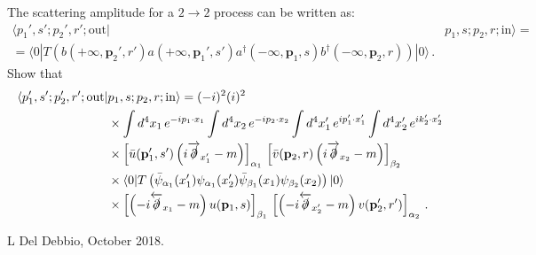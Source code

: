 \documentclass[12pt,a4paper]{article}
\begin{document}
\begin{enumerate}
    The scattering amplitude for a $2\longrightarrow 2$ process can be
    written as: 
    \begin{align}
      \label{eq:4}
      \langle p_1', s'; p_2', r';\mathrm{out} | 
      &p_1, s; p_2, r; \mathrm{in} \rangle 
      = \nonumber \\
      = \langle 0 | T\left(
        b(+\infty,\mathbf{p}_2',r') a(+\infty,\mathbf{p}_1',s') 
        a^\dagger(-\infty,\mathbf{p}_1,s) b^\dagger(-\infty,\mathbf{p}_2,r)
        \right) |0 \rangle\, .
    \end{align}
    Show that
    \begin{align}
      \label{eq:5}
      \langle p_1', s'; p_2', r';\mathrm{out} |
      & p_1, s; p_2, r; \mathrm{in} \rangle = (-i)^{2} (i)^{2} \nonumber \\
      & \times \int d^4x_1\, e^{-i p_1\cdot x_1}  
        \int d^4x_2\, e^{-i p_2\cdot x_2}
        \int d^4x_1'\, e^{i p_1'\cdot x_1'} 
        \int d^4x_2'\, e^{i k_2'\cdot x_2'} \nonumber \\
      & \times \left[\bar{u}(\mathbf{p}_1',s') 
         \left(i\overrightarrow{\slashed{\partial}}_{x_1'} -
         m\right)\right]_{\alpha_1}\,  
         \left[\bar{v}(\mathbf{p}_2,r) 
         \left(i\overrightarrow{\slashed{\partial}}_{x_2} -
         m\right)\right]_{\beta_2}   \nonumber \\
      & \times \langle 0 | T\left(
        \bar\psi_{\alpha_1}(x_1') \psi_{\alpha_1}(x_2') \bar{\psi}_{\beta_1}(x_1) \psi_{\beta_2}(x_2)
        \right) |0 \rangle \nonumber \\
      & \times \left[\left(-i\overleftarrow{\slashed{\partial}}_{x_1} -
        m\right) u(\mathbf{p}_1,s)\right]_{\beta_1}\,  
        \left[\left(-i\overleftarrow{\slashed{\partial}}_{x_2'} -
        m\right) v(\mathbf{p}_2',r')\right]_{\alpha_2}\, .        
    \end{align}

\end{enumerate}

\vfill
\hspace*{\fill}\tiny L Del Debbio, October 2018.
\end{document}
